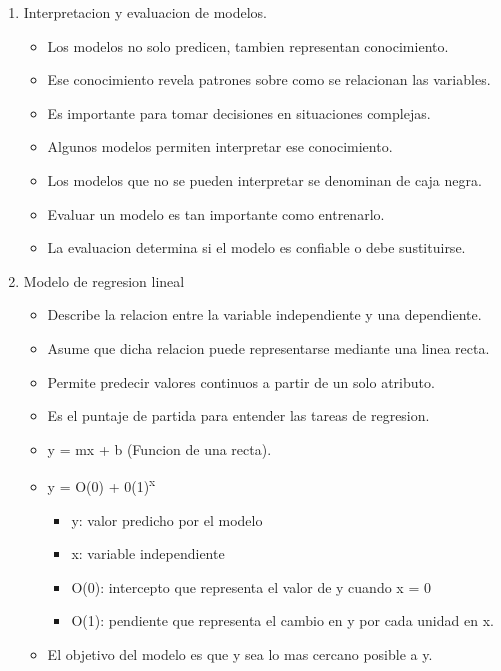 \documentclass[11pt]{article}
\begin{document}
\begin{enumerate}
\begin{itemize}
\item Si la variable objetivo es categorica, el modelo se llama \textbf{clasificador}.
\item Si la variable objetivo es numerica, el modelo se llama de \textbf{regresion}.
\end{itemize}
\item Interpretacion y evaluacion de modelos.
\label{sec:org1fb6cb6}
\begin{itemize}
\item Los modelos no solo predicen, tambien representan conocimiento.
\item Ese conocimiento revela patrones sobre como se relacionan las variables.
\item Es importante para tomar decisiones en situaciones complejas.
\item Algunos modelos permiten interpretar ese conocimiento.
\item Los modelos que no se pueden interpretar se denominan de caja negra.
\item Evaluar un modelo es tan importante como entrenarlo.
\item La evaluacion determina si el modelo es confiable o debe sustituirse.
\end{itemize}
\item Modelo de regresion lineal
\label{sec:org25d0f9e}
\begin{itemize}
\item Describe la relacion entre la variable independiente y una dependiente.
\item Asume que dicha relacion puede representarse mediante una linea recta.
\item Permite predecir valores continuos a partir de un solo atributo.
\item Es el puntaje de partida para entender las tareas de regresion.
\item y = mx + b (Funcion de una recta).
\item y = O(0) + 0(1)\textsuperscript{x}
\begin{itemize}
\item y: valor predicho por el modelo
\item x: variable independiente
\item O(0): intercepto que representa el valor de y cuando x = 0
\item O(1): pendiente que representa el cambio en y por cada unidad en x.
\end{itemize}
\item El objetivo del modelo es que y sea lo mas cercano posible a y.

\end{itemize}
\end{enumerate}
\end{document}
